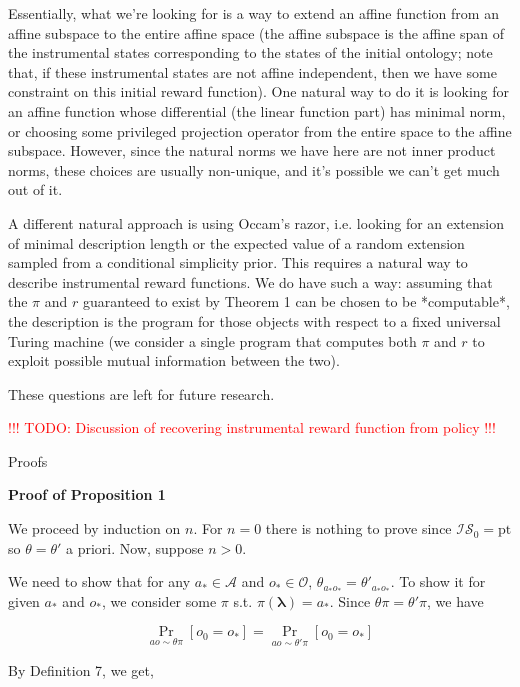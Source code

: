 \documentclass[a4paper]{article}
\newcommand{\Co}[1]{}
\newcommand{\AB}[1]{\left[#1\right]}
\newcommand{\Pa}[2]{\underset{#1}{\operatorname{Pr}}\AB{#2}}
\newcommand{\Pt}{\boldsymbol{\mathrm{pt}}}
\newcommand{\Estr}{\boldsymbol{\lambda}}
\newcommand{\A}{\mathcal{A}}
\newcommand{\Ob}{\mathcal{O}}
\newcommand{\IS}{\mathcal{IS}}
\begin{document}
Essentially, what we're looking for is a way to extend an affine function from an affine subspace to the entire affine space (the affine subspace is the affine span of the instrumental states corresponding to the states of the initial ontology; note that, if these instrumental states are not affine independent, then we have some constraint on this initial reward function). One natural way to do it is looking for an affine function whose differential (the linear function part) has minimal norm, or choosing some privileged projection operator from the entire space to the affine subspace. However, since the natural norms we have here are not inner product norms, these choices are usually non-unique, and it's possible we can't get much out of it.

A different natural approach is using Occam's razor, i.e. looking for an extension of minimal description length or the expected value of a random extension sampled from a conditional simplicity prior. This requires a natural way to describe instrumental reward functions. We do have such a way: assuming that the $\pi$ and $r$ guaranteed to exist by Theorem 1 can be chosen to be *computable*, the description is the program for those objects with respect to a fixed universal Turing machine (we consider a single program that computes both $\pi$ and $r$ to exploit possible mutual information between the two).

These questions are left for future research.

\textcolor{red}{!!! TODO: Discussion of recovering instrumental reward function from policy !!!}

\begin{Huge}Proofs\end{Huge}

\textbf{Proof of Proposition 1}\Co{b}

We proceed by induction on $n$. For $n=0$ there is nothing to prove since $\IS_0=\Pt$ so $\theta=\theta'$ a priori. Now, suppose $n>0$.

We need to show that for any $a_*\in\A$ and $o_*\in\Ob$, $\theta_{a_*o_*}=\theta'_{a_*o_*}$. To show it for given $a_*$ and $o_*$, we consider some $\pi$ s.t. $\pi(\Estr)=a_*$. Since $\theta\pi=\theta'\pi$, we have

$$\Pa{ao\sim\theta\pi}{o_0=o_*}=\Pa{ao\sim\theta'\pi}{o_0=o_*}$$

By Definition 7, we get,
\end{document}
